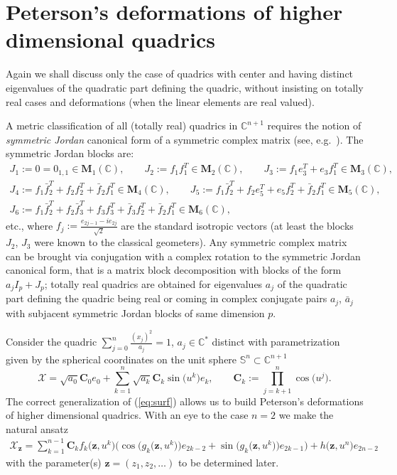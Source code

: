 \documentclass[pdftex]{sigma}
\begin{document}
\section{Peterson's deformations of higher dimensional quadrics}\label{sec:pet1}

Again we shall discuss only the case of quadrics with center and
having distinct eigenvalues of the quadratic part def\/ining the
quadric, without insisting on totally real cases and deformations
(when the linear elements are real valued).

\begin{remark}
A metric classif\/ication of all (totally real) quadrics in
$\mathbb{C}^{n+1}$ requires the notion of {\it symmetric Jordan}
canonical form of a symmetric complex matrix (see, e.g.~\cite{H}). The symmetric Jordan blocks are:
\begin{gather*}
J_1:=0=0_{1,1}\in\mathbf{M}_1(\mathbb{C}),\qquad
J_2:=f_1f_1^T\in\mathbf{M}_2(\mathbb{C}),\qquad
J_3:=f_1e_3^T+e_3f_1^T\in\mathbf{M}_3(\mathbb{C}),
\\
J_4:=f_1\bar f_2^T+f_2f_2^T+\bar
f_2f_1^T\in\mathbf{M}_4(\mathbb{C}),\qquad J_5:= f_1\bar
f_2^T+f_2e_5^T+e_5f_2^T+\bar
f_2f_1^T\in\mathbf{M}_5(\mathbb{C}),
\\
J_6:= f_1\bar f_2^T+f_2\bar f_3^T+f_3f_3^T+\bar f_3f_2^T+\bar
f_2f_1^T\in\mathbf{M}_6(\mathbb{C}),
\end{gather*}
etc., where $f_j:=\frac{e_{2j-1}-ie_{2j}}{\sqrt{2}}$ are the
standard isotropic vectors (at least the blocks $J_2$, $J_3$ were
known to the classical geometers). Any symmetric complex matrix
can be brought via conjugation with a complex rotation to the
symmetric Jordan canonical form, that is a matrix block
decomposition with blocks of the form $a_jI_p+J_p$; totally real
quadrics are obtained for eigenvalues $a_j$ of the quadratic part
def\/ining the quadric being real or coming in complex conjugate
pairs $a_j$, $\bar a_j$ with subjacent symmetric Jordan blocks of
same dimension $p$.
\end{remark}

Consider the quadric $\sum\limits_{j=0}^n\frac{(x_j)^2}{a_j}=1$, $
a_j\in\mathbb{C}^*$ distinct with parametrization given by the
spherical coordinates on the unit sphere
$\mathbb{S}^n\subset\mathbb{C}^{n+1}$
\[
\mathcal{X}=\sqrt{a_0}\mathbf{C}_0e_0+
\sum_{k=1}^n\sqrt{a_k}\mathbf{C}_k\sin\big(u^k\big)e_k,\qquad
\mathbf{C}_k:=\prod_{j=k+1}^n\cos\big(u^j\big).
\]
The correct generalization of (\ref{eq:surf}) allows us to build
Peterson's deformations of higher dimensional quadrics. With an
eye to the case $n=2$ we make the natural ansatz
\begin{gather}
\mathcal{X}_{\mathbf{z}}=\sum_{k=1}^{n-1}\mathbf{C}_kf_k\big(\mathbf{z},u^k\big)
\big(\cos\big(g_k\big(\mathbf{z},u^k\big)\big)e_{2k-2}
+\sin\big(g_k\big(\mathbf{z},u^k\big)\big)e_{2k-1}\big)+h\big(\mathbf{z},u^n\big)e_{2n-2}\label{eq:surf3}
\end{gather}
with the parameter(s) $\mathbf{z}=(z_1,z_2,\dots )$ to be determined
later.
\end{document}
